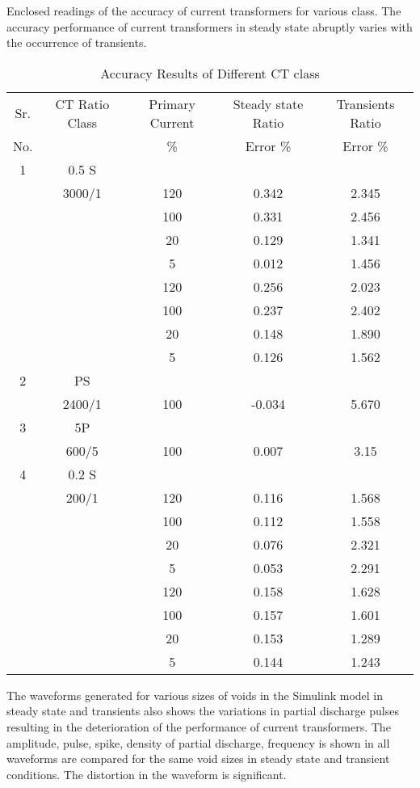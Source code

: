 Enclosed readings of the accuracy of current transformers for various class. The accuracy performance of current transformers in steady state abruptly varies with the occurrence of transients.

\begin{table}[h!]
\caption{Accuracy Results of Different CT class}
\label{table:Accuracy Results of Different CT class}
\centering
\begin{tabular}{|c|c|c|c|c|}
\hline 
Sr. & CT Ratio Class	& Primary Current	& Steady state Ratio	& Transients Ratio \\
No. &					& \% 				& Error \% 				&  Error \% 		\\ \hline \hline
1	&0.5 S	& 		& 			& 			\\ \hline 
 	&3000/1 & 120	&	0.342	& 2.345 	\\ \hline 
 	&		& 100	&	0.331	& 2.456	\\ \hline 
 	&		& 20	& 0.129	& 1.341	\\ \hline 
 	&		& 5		& 0.012	&1.456	\\ \hline 
 	&		&120	&0.256	&2.023	\\ \hline 
 	&		&100	&0.237	&2.402	\\ \hline 
 	&		&20		&0.148	&1.890	\\ \hline 
 	&		&5		&0.126	&1.562	\\ \hline \hline
2	&PS		& 		& 			&			\\ \hline  
 	&2400/1	&100	&-0.034	&5.670	\\ \hline \hline
3	&5P		& 		& 			& 			\\ \hline 
 	&600/5	&100	&0.007	&3.15		\\ \hline \hline
4	&0.2 S	& 		& 			& 			\\ \hline 
 	&200/1	& 120	&0.116	&1.568	\\ \hline 
 	& 		& 100	&0.112	&1.558	\\ \hline 
 	& 		& 20	&0.076	&2.321	\\ \hline
 	&		& 5		&0.053	&2.291	\\ \hline
 	& 		& 120	&0.158	&1.628	\\ \hline
 	& 		& 100	&0.157	&1.601	\\ \hline
 	& 		& 20	&0.153	&1.289	\\ \hline
 	& 		& 5		&0.144	&1.243	\\ \hline
\end{tabular} 
\end{table}

The waveforms generated for various sizes of voids in the Simulink model in steady state and transients also shows the variations in partial discharge pulses resulting in the deterioration of the performance of current transformers. The amplitude, pulse, spike, density of partial discharge, frequency is shown in all waveforms are compared for the same void sizes in steady state and transient conditions. The distortion in the waveform is significant.

